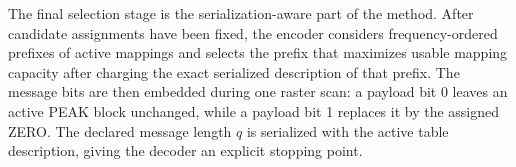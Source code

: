 The final selection stage is the serialization-aware part of the method. After
candidate assignments have been fixed, the encoder considers frequency-ordered
prefixes of active mappings and selects the prefix that maximizes usable mapping capacity
after charging the exact serialized description of that prefix. The message bits
are then embedded during one raster scan: a payload bit 0 leaves an active PEAK
block unchanged, while a payload bit 1 replaces it by the assigned ZERO. The
declared message length $q$ is serialized with the active table description,
giving the decoder an explicit stopping point.

